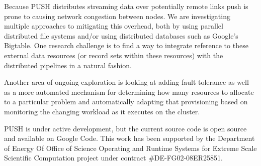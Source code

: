 \documentclass{sig-alt-release2}
\begin{document}
Because PUSH distributes streaming data over potentially remote links push 
is prone to causing network congestion between nodes. 
We are investigating multiple approaches to mitigating this overhead, both
by using parallel distributed file systems and/or using distributed
databases such as Google's Bigtable.
One research challenge is to find a way to integrate reference to these
external data resources (or record sets within these resources) with the
distributed pipelines in a natural fashion.

Another area of ongoing exploration is looking at adding fault tolerance as 
well as a more automated mechanism for determining how many resources to 
allocate to a particular problem and automatically adapting that provisioning 
based on monitoring the changing workload as it executes on the 
cluster.

PUSH is under active development, but the current source code is open source 
and available on Google Code.
This work has been supported by the Department of Energy Of Office of Science Operating and Runtime Systems for Extreme Scale Scientific Computation project under contract \#DE-FG02-08ER25851. 



\end{document}

